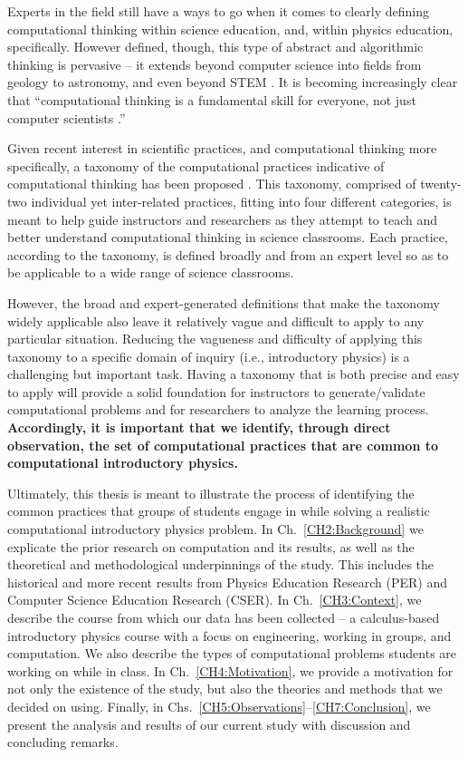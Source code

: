 \documentclass{msuphddissertation}
\begin{document}
\begin{doublespace}
Experts in the field still have a ways to go when it comes to clearly defining computational thinking within science education, and, within physics education, specifically.  However defined, though, this type of abstract and algorithmic thinking is pervasive -- it extends beyond computer science into fields from geology to astronomy, and even beyond STEM \cite{Bundy2007}.  It is becoming increasingly clear that ``computational thinking is a fundamental skill for everyone, not just computer scientists \cite{Wing2006}.''

Given recent interest in scientific practices, and computational thinking more specifically, a taxonomy of the computational practices indicative of computational thinking has been proposed \cite{Weintrop2015}.  This taxonomy, comprised of twenty-two individual yet inter-related practices, fitting into four different categories, is meant to help guide instructors and researchers as they attempt to teach and better understand computational thinking in science classrooms.  Each practice, according to the taxonomy, is defined broadly and from an expert level so as to be applicable to a wide range of science classrooms.

However, the broad and expert-generated definitions that make the taxonomy widely applicable also leave it relatively vague and difficult to apply to any particular situation.  Reducing the vagueness and difficulty of applying this taxonomy to a specific domain of inquiry (i.e., introductory physics) is a challenging but important task.  Having a taxonomy that is both precise and easy to apply will provide a solid foundation for instructors to generate/validate computational problems and for researchers to analyze the learning process.  \textbf{Accordingly, it is important that we identify, through direct observation, the set of computational practices that are common to computational introductory physics.}  %

Ultimately, this thesis is meant to illustrate the process of identifying the common practices that groups of students engage in while solving a realistic computational introductory physics problem.  In Ch.~\ref{CH2:Background} we explicate the prior research on computation and its results, as well as the theoretical and methodological underpinnings of the study.  This includes the historical and more recent results from Physics Education Research (PER) and Computer Science Education Research (CSER).  In Ch.~\ref{CH3:Context}, we describe the course from which our data has been collected -- a calculus-based introductory physics course with a focus on engineering, working in groups, and computation.  We also describe the types of computational problems students are working on while in class.  In Ch.~\ref{CH4:Motivation}, we provide a motivation for not only the existence of the study, but also the theories and methods that we decided on using.  Finally, in Chs.~\ref{CH5:Observations}--\ref{CH7:Conclusion}, we present the analysis and results of our current study with discussion and concluding remarks.


\end{doublespace}
\end{document}
